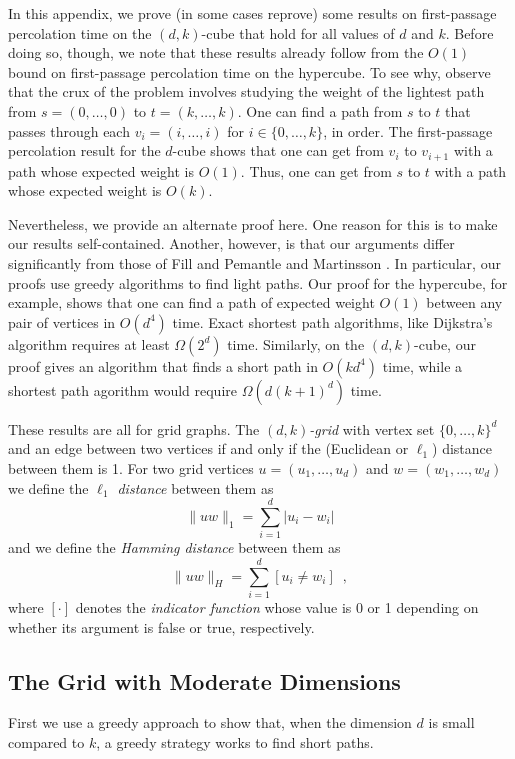 \documentclass[lotsofwhite]{patmorin}
\begin{document}
In this appendix, we prove (in some cases reprove) some results on
first-passage percolation time on the $(d,k)$-cube that hold for
all values of $d$ and $k$.  Before doing so, though, we note that
these results already follow from the $O(1)$ bound on first-passage
percolation time on the hypercube.  To see why, observe that the
crux of the problem involves studying the weight of the lightest path
from $s=(0,\ldots,0)$ to $t=(k,\ldots,k)$. One can find a
path from $s$ to $t$ that passes through each $v_i=(i,\ldots,i)$ for
$i\in\{0,\ldots,k\}$, in order.  The first-passage percolation
result for the $d$-cube shows that one can get from $v_i$ to $v_{i+1}$
with a path whose expected weight is $O(1)$.  Thus, one can get from $s$
to $t$ with a path whose expected weight is $O(k)$.

Nevertheless, we provide an alternate proof here.  One reason for this
is to make our results self-contained.  Another, however, is that
our arguments differ significantly from those of Fill and Pemantle
\cite{fill.pemantle:percolation} and Martinsson \cite{martinsson:unoriented}.
In particular, our proofs use greedy algorithms to find light paths.
Our proof for the hypercube, for example, shows that one can find a path
of expected weight $O(1)$ between any pair of vertices in $O(d^4)$ time.
Exact shortest path algorithms, like Dijkstra's algorithm requires at
least $\Omega(2^d)$ time.  Similarly, on the $(d,k)$-cube, our proof
gives an algorithm that finds a short path in $O(kd^4)$ time, while a
shortest path agorithm would require $\Omega(d(k+1)^d)$ time.

These results are all for grid graphs.  The \emph{$(d,k)$-grid} with
vertex set $\{0,\ldots,k\}^d$ and an edge between two vertices if
and only if the (Euclidean or $\ell_1$) distance between them is 1.
For two grid vertices $u=(u_1,\ldots,u_d)$ and $w=(w_1,\ldots,w_d)$
we define the \emph{$\ell_1$ distance} between them as
\[
   \|uw\|_1 = \sum_{i=1}^d |u_i-w_i|
\]
and we define the \emph{Hamming distance} between them as
\[
   \|uw\|_H = \sum_{i=1}^d [u_i\neq w_i] \enspace ,
\]
where $[\cdot]$ denotes the \emph{indicator function} whose value is 0
or 1 depending on whether its argument is false or true, respectively.

\subsection{The Grid with Moderate Dimensions}

First we use a greedy approach to show that, when the dimension $d$
is small compared to $k$, a greedy strategy works to find short paths.
\end{document}
